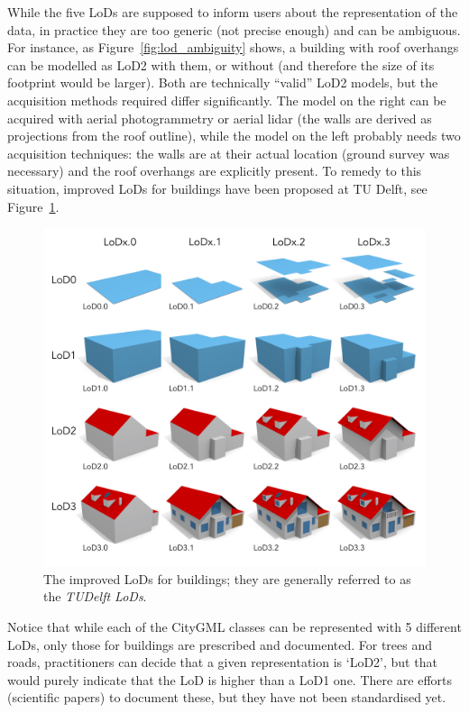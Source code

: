While the five LoDs are supposed to inform users about the representation of the data, in practice they are too generic (not precise enough) and can be ambiguous. 
For instance, as Figure~\ref{fig:lod_ambiguity} shows,
a building with roof overhangs can be modelled as LoD2 with them, or without (and therefore the size of its footprint would be larger).
Both are technically ``valid'' LoD2 models, but the acquisition methods required differ significantly.
The model on the right can be acquired with aerial photogrammetry or aerial lidar (the walls are derived as projections from the roof outline), while the model on the left probably needs two acquisition techniques: the walls are at their actual location (ground survey was necessary) and the roof overhangs are explicitly present.
To remedy to this situation, improved LoDs for buildings have been proposed at TU Delft, see Figure~\ref{fig:refinedLODs}.
\begin{figure}
  \centering
  \includegraphics[width=\linewidth]{figs/refinedLODs}
  \caption{The improved LoDs for buildings; they are generally referred to as the \emph{TUDelft LoDs}.}%
\label{fig:refinedLODs}
\end{figure}

%

Notice that while each of the CityGML classes can be represented with 5 different LoDs, only those for buildings are prescribed and documented.
For trees and roads, practitioners can decide that a given representation is `LoD2', but that would purely indicate that the LoD is higher than a LoD1 one.
There are efforts (scientific papers) to document these, but they have not been standardised yet.


